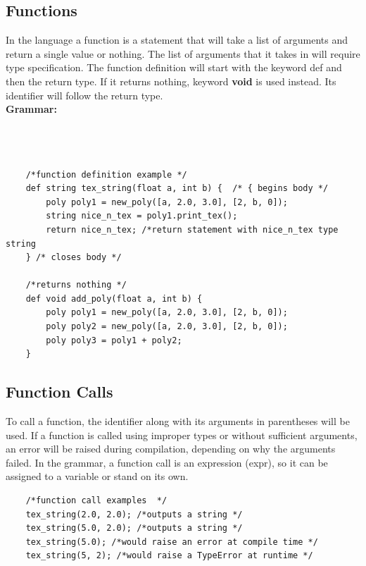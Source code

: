 \documentclass{article}
\begin{document}
\subsection{Functions}
In the language a function is a statement that will take a list of arguments and return a single value or nothing. The list of arguments that it takes in will require type specification. The function definition will start with the keyword def and then the return type. If it returns nothing, keyword \textbf{void} is used instead. Its identifier will follow the return type. \\
\textbf{Grammar:}\\
    \\
    \\
\\ 
\begin{lstlisting}
    /*function definition example */
    def string tex_string(float a, int b) {  /* { begins body */
        poly poly1 = new_poly([a, 2.0, 3.0], [2, b, 0]);
        string nice_n_tex = poly1.print_tex();
        return nice_n_tex; /*return statement with nice_n_tex type string
    } /* closes body */
    
    /*returns nothing */
    def void add_poly(float a, int b) {  
        poly poly1 = new_poly([a, 2.0, 3.0], [2, b, 0]);
        poly poly2 = new_poly([a, 2.0, 3.0], [2, b, 0]);
        poly poly3 = poly1 + poly2;
    } 
\end{lstlisting}
\subsection{Function Calls}

To call a function, the identifier along with its arguments in parentheses will be used. If a function is called using improper types or without sufficient arguments, an error will be raised during compilation, depending on why the arguments failed. In the grammar, a function call is an expression (expr), so it can be assigned to a variable or stand on its own.  \\
\begin{lstlisting}
    /*function call examples  */
    tex_string(2.0, 2.0); /*outputs a string */
    tex_string(5.0, 2.0); /*outputs a string */
    tex_string(5.0); /*would raise an error at compile time */
    tex_string(5, 2); /*would raise a TypeError at runtime */
\end{lstlisting}
\end{document}

